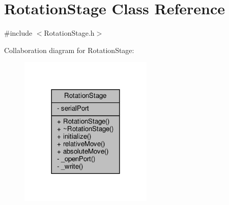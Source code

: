 \hypertarget{class_rotation_stage}{}\section{Rotation\+Stage Class Reference}
\label{class_rotation_stage}


{\ttfamily \#include $<$Rotation\+Stage.\+h$>$}



Collaboration diagram for Rotation\+Stage\+:\nopagebreak
\begin{figure}[H]
\begin{center}
\leavevmode
\includegraphics[width=180pt]{class_rotation_stage__coll__graph}
\end{center}
\end{figure}
